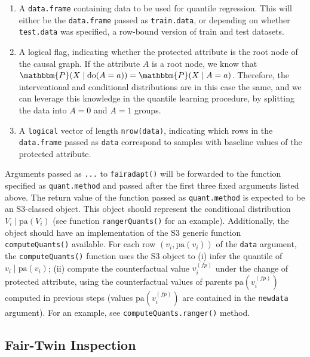 \documentclass[
  nojss]{jss}
\providecommand{\tightlist}{%
  \setlength{\itemsep}{0pt}\setlength{\parskip}{0pt}}
\begin{document}
\begin{enumerate}
\def\labelenumi{\arabic{enumi}.}
\tightlist
\item
  A \texttt{data.frame} containing data to be used for quantile
  regression. This will either be the \texttt{data.frame} passed as
  \texttt{train.data}, or depending on whether \texttt{test.data} was
  specified, a row-bound version of train and test datasets.
\item
  A logical flag, indicating whether the protected attribute is the root
  node of the causal graph. If the attribute \(A\) is a root node, we
  know that
  \(\mathbbm{P}(X \mid \text{do}(A = a)) = \mathbbm{P}(X \mid A = a)\).
  Therefore, the interventional and conditional distributions are in
  this case the same, and we can leverage this knowledge in the quantile
  learning procedure, by splitting the data into \(A = 0\) and \(A = 1\)
  groups.
\item
  A \texttt{logical} vector of length \texttt{nrow(data)}, indicating
  which rows in the \texttt{data.frame} passed as \texttt{data}
  correspond to samples with baseline values of the protected attribute.
\end{enumerate}

Arguments passed as \texttt{...} to \texttt{fairadapt()} will be
forwarded to the function specified as \texttt{quant.method} and passed
after the first three fixed arguments listed above. The return value of
the function passed as \texttt{quant.method} is expected to be an
S3-classed object. This object should represent the conditional
distribution \(V_i \mid \mathrm{pa}(V_i)\) (see function
\texttt{rangerQuants()} for an example). Additionally, the object should
have an implementation of the S3 generic function
\texttt{computeQuants()} available. For each row
\((v_i, \mathrm{pa}(v_i))\) of the \texttt{data} argument, the
\texttt{computeQuants()} function uses the S3 object to (i) infer the
quantile of \(v_i \mid \mathrm{pa}(v_i)\); (ii) compute the
counterfactual value \( {v}^{(fp)}_i\) under the change of protected
attribute, using the counterfactual values of parents
\(\mathrm{pa}( {v}^{(fp)}_i)\) computed in previous steps (values
\(\mathrm{pa}( {v}^{(fp)}_i)\) are contained in the \texttt{newdata}
argument). For an example, see \texttt{computeQuants.ranger()} method.

\hypertarget{fair-twin-inspection}{%
\subsection{Fair-Twin Inspection}\label{fair-twin-inspection}}
\end{document}
